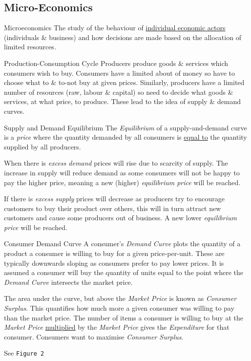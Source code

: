 \documentclass[11pt,a4paper]{article}
\begin{document}
\subsection{Micro-Economics}

  \begin{definition}{Microeconomics}
    The study of the behaviour of \underline{individual economic actors} (individuals \& business) and how decisions are made based on the allocation of limited resources.
  \end{definition}

  \begin{definition}{Production-Consumption Cycle}
    Producers produce goods \& services which consumers wish to buy. Consumers have a limited about of money so have to choose what to \& to-not buy at given prices. Similarly, producers have a limited number of resources (raw, labour \& capital) so need to decide what goods \& services, at what price, to produce. These lead to the idea of supply \& demand curves.
  \end{definition}

  \begin{definition}{Supply and Demand Equilibrium}
    The \textit{Equilibrium} of a supply-and-demand curve is a \textit{price} where the quantity demanded by all consumers is \underline{equal to} the quantity supplied by all producers.
    \par When there is \textit{excess demand} prices will rise due to scarcity of supply. The increase in supply will reduce demand as some consumers will not be happy to pay the higher price, meaning a new (higher) \textit{equilibrium price} will be reached.
    \par If there is \textit{excess supply} prices will decrease as producers try to encourage customers to buy their product over others, this will in turn attract new customers and cause some producers out of business. A new lower \textit{equilibrium price} will be reached.
  \end{definition}

  \begin{definition}{Consumer Demand Curve}
    A consumer's \textit{Demand Curve} plots the quantity of a product a consumer is willing to buy for a given price-per-unit. These are typically downwards sloping as consumers prefer to pay lower prices. It is assumed a consumer will buy the quantity of units equal to the point where the \textit{Demand Curve} intersects the market price.

    \par The area under the curve, but above the \textit{Market Price} is known as \textit{Consumer Surplus}. This quantifies how much more a given consumer was willing to pay than the market price. The number of items a consumer is willing to buy at the \textit{Market Price} \underline{multiplied} by the \textit{Market Price} gives the \textit{Expenditure} for that consumer. Consumers want to maximise \textit{Consumer Surplus}.

    \par See \texttt{Figure 2}
  \end{definition}
\end{document}
